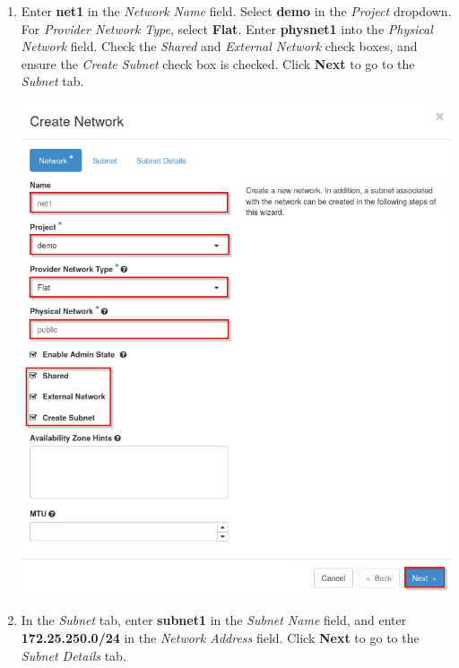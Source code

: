 \documentclass[letterpaper, 12pt]{article}
\begin{document}
\begin{enumerate}
    \item Enter \textbf{net1} in the \textit{Network Name} field. Select \textbf{demo} in the \textit{Project} dropdown.
    For \textit{Provider Network Type}, select \textbf{Flat}. Enter \textbf{physnet1} into the \textit{Physical Network}
    field. Check the \textit{Shared} and \textit{External Network} check boxes, and ensure the \textit{Create Subnet}
    check box is checked. Click \textbf{Next} to go to the \textit{Subnet} tab.

    \begin{center}
        \includegraphics[width=\linewidth]{images/part1/step5.png}
    \end{center}

    \item In the \textit{Subnet} tab, enter \textbf{subnet1} in the \textit{Subnet Name} field, and enter
    \textbf{172.25.250.0/24} in the \textit{Network Address} field. Click \textbf{Next} to go to the \textit{Subnet
    Details} tab.


\end{enumerate}
\end{document}
